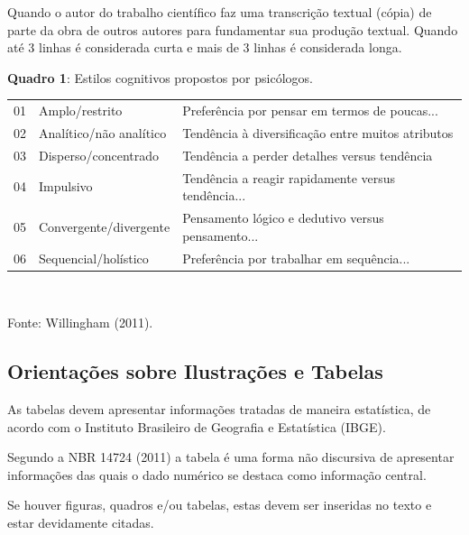 \documentclass[12pt, a4paper]{article}
\begin{document}
Quando o autor do trabalho científico faz uma transcrição textual (cópia) de parte da obra de outros autores para fundamentar sua produção textual. Quando até 3 linhas é considerada curta e mais de 3 linhas é considerada longa.

\vspace{0.5cm}
\begin{center}
    \textbf{Quadro 1}: Estilos cognitivos propostos por psicólogos. \\[0.2cm]
    \small
    \begin{tabular}{lp{4cm}p{7cm}}
        \toprule
        01 & Amplo/restrito & Preferência por pensar em termos de poucas... \\
        02 & Analítico/não analítico & Tendência à diversificação entre muitos atributos \\
        03 & Disperso/concentrado & Tendência a perder detalhes versus tendência \\
        04 & Impulsivo & Tendência a reagir rapidamente versus tendência... \\
        05 & Convergente/divergente & Pensamento lógico e dedutivo versus pensamento... \\
        06 & Sequencial/holístico & Preferência por trabalhar em sequência... \\
        \bottomrule
    \end{tabular}\\[0.2cm]
    \raggedright \small Fonte: Willingham (2011).
\end{center}
\vspace{0.5cm}

\subsection{Orientações sobre Ilustrações e Tabelas}

As tabelas devem apresentar informações tratadas de maneira estatística, de acordo com o Instituto Brasileiro de Geografia e Estatística (IBGE).

Segundo a NBR 14724 (2011) a tabela é uma forma não discursiva de apresentar informações das quais o dado numérico se destaca como informação central.

Se houver figuras, quadros e/ou tabelas, estas devem ser inseridas no texto e estar devidamente citadas.
\end{document}
